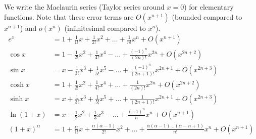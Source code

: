   \begin{corollary}
  We write the Maclaurin series (Taylor series around $x = 0$) for elementary functions. Note that these error terms are $O(x^{n+1})$ (bounded compared to $x^{n+1}$) and $o(x^n)$ (infinitesimal compared to $x^n$). 
  \begin{align*}
      e^x & = 1 + \frac{1}{1!} x + \frac{1}{2!} x^2 + \ldots + \frac{1}{n!} x^n + O(x^{n+1}) \\
      \cos{x} & = 1 - \frac{1}{2!} x^2 + \frac{1}{4!}x^4 - \ldots + \frac{(-1)^n}{(2n)!} x^{2n} + O(x^{2n+2}) \\
      \sin{x} & = x - \frac{1}{3!} x^3 + \frac{1}{5!}x^5 - \ldots + \frac{(-1)^n}{(2n+1)!} x^{2n+1} + O(x^{2n+3}) \\
      \cosh{x} & = 1 + \frac{1}{2!} x^2 + \frac{1}{4!} x^4 + \ldots + \frac{1}{(2n)!} x^{2n} + O(x^{2n+2}) \\
      \sinh{x} & = x + \frac{1}{3!} x^3 + \frac{1}{5!} x^5 + \ldots + \frac{1}{(2n+1)!} x^{2n+1} + O(x^{2n+3}) \\
      \ln{(1+x)} & = x - \frac{1}{2}x^2 + \frac{1}{3} x^3 - \ldots + \frac{(-1)^n}{n} x^n + O(x^{n+1}) \\
      (1 + x)^\alpha & = 1 + \frac{\alpha}{1!} x + \frac{\alpha(\alpha-1)}{2!} x^2 + \ldots + \frac{\alpha (\alpha-1) \ldots (\alpha - n + 1)}{n!} x^n + O(x^{n+1})
  \end{align*}
  \end{corollary}

